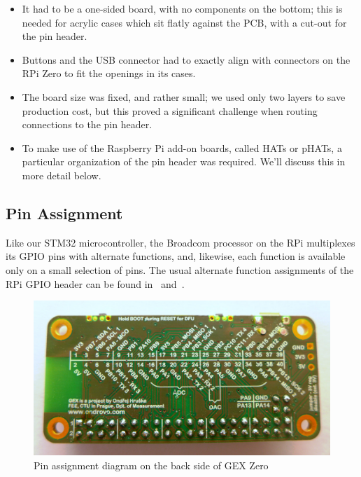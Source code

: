 \begin{itemize}
	\item It had to be a one-sided board, with no components on the bottom; this is needed for acrylic cases which sit flatly against the \gls{PCB}, with a cut-out for the pin header.
	\item Buttons and the USB connector had to exactly align with connectors on the RPi Zero to fit the openings in its cases.
	\item The board size was fixed, and rather small; we used only two layers to save production cost, but this proved a significant challenge when routing connections to the pin header.
	\item To make use of the Raspberry Pi add-on boards, called HATs or pHATs, a particular organization of the pin header was required. We'll discuss this in more detail below.
\end{itemize}

\subsection{Pin Assignment}

Like our STM32 microcontroller, the Broadcom processor on the RPi multiplexes its \gls{GPIO} pins with alternate functions, and, likewise, each function is available only on a small selection of pins. The usual alternate function assignments of the RPi \gls{GPIO} header can be found in~\cite{piheader} and~\cite{piheaderxyz}.

\begin{figure}[h]
	\centering
	\includegraphics[width=.85\textwidth]{img/photo-zero-naked-bottom.jpg}
	\caption[GEX Zero back side]{\label{fig:gexz}Pin assignment diagram on the back side of GEX Zero}
\end{figure}

